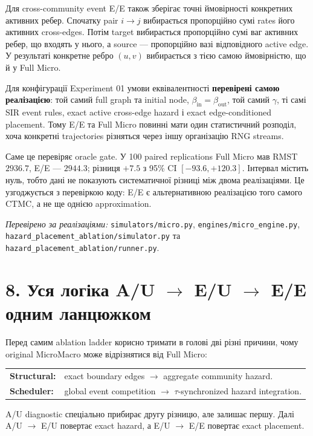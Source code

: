 \documentclass[11pt,a4paper]{article}
\begin{document}
Для cross-community event E/E також зберігає точні ймовірності конкретних активних ребер. Спочатку pair $i\to j$ вибирається пропорційно сумі rates його активних cross-edges. Потім target вибирається пропорційно сумі ваг активних ребер, що входять у нього, а source --- пропорційно вазі відповідного active edge. У результаті конкретне ребро $(u,v)$ вибирається з тією самою ймовірністю, що й у Full Micro.

\begin{tcolorbox}[colback=soft,colframe=exact,title={Отже, тут не треба писати ``if rules match''}]
Для конфігурації Experiment 01 умови еквівалентності \textbf{перевірені самою реалізацією}: той самий full graph та initial node, $\beta_{\mathrm{in}}=\beta_{\mathrm{out}}$, той самий $\gamma$, ті самі SIR event rules, exact active cross-edge hazard і exact edge-conditioned placement. Тому E/E та Full Micro повинні мати один статистичний розподіл, хоча конкретні trajectories різняться через іншу організацію RNG streams.
\end{tcolorbox}

Саме це перевіряє oracle gate. У 100 paired replications Full Micro мав RMST $2936.7$, E/E --- $2944.3$; різниця $+7.5$ з 95\% CI $[-93.6,+120.3]$. Інтервал містить нуль, тобто дані не показують систематичної різниці між двома реалізаціями. Це узгоджується з перевіркою коду: E/E є альтернативною реалізацією того самого CTMC, а не ще однією approximation.

\textit{Перевірено за реалізаціями:} \texttt{simulators/micro.py}, \texttt{engines/micro\_engine.py},\\
\texttt{hazard\_placement\_ablation/simulator.py} та \texttt{hazard\_placement\_ablation/runner.py}.

\section*{8. Уся логіка A/U $\to$ E/U $\to$ E/E одним ланцюжком}

Перед самим ablation ladder корисно тримати в голові дві різні причини, чому original MicroMacro може відрізнятися від Full Micro:
\begin{center}
\begin{tabular}{>{\raggedright\arraybackslash}p{29mm} >{\raggedright\arraybackslash}p{112mm}}
\textbf{Structural:} & exact boundary edges $\to$ aggregate community hazard.\\[2pt]
\textbf{Scheduler:} & global event competition $\to$ $\tau$-synchronized hazard integration.
\end{tabular}
\end{center}
A/U diagnostic спеціально прибирає другу різницю, але залишає першу. Далі A/U $\to$ E/U повертає exact hazard, а E/U $\to$ E/E повертає exact placement.
\end{document}
